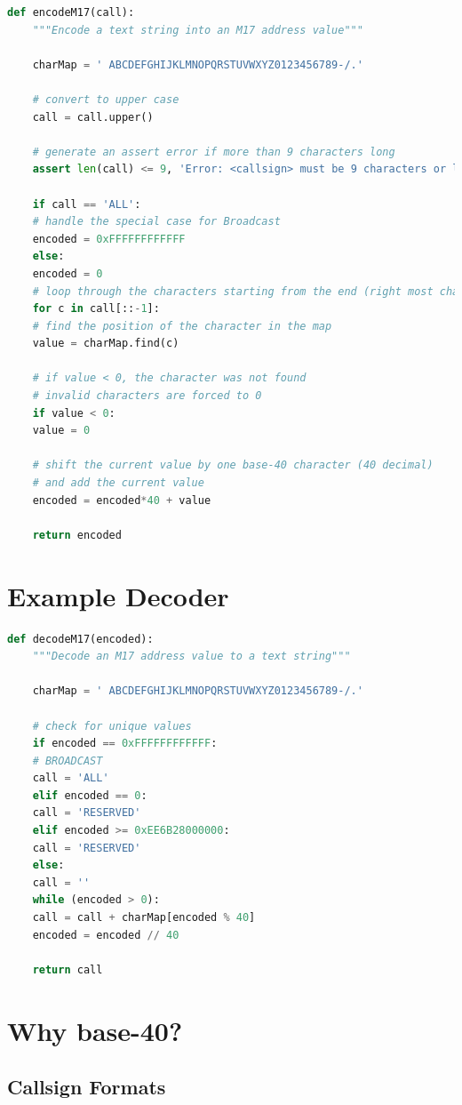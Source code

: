 \documentclass[a4paper,11pt]{book}
\begin{document}
\begin{lstlisting}[language=Python]
def encodeM17(call):
	"""Encode a text string into an M17 address value"""
	
	charMap = ' ABCDEFGHIJKLMNOPQRSTUVWXYZ0123456789-/.'
	
	# convert to upper case
	call = call.upper()
	
	# generate an assert error if more than 9 characters long
	assert len(call) <= 9, 'Error: <callsign> must be 9 characters or less'
	
	if call == 'ALL':
	# handle the special case for Broadcast
	encoded = 0xFFFFFFFFFFFF
	else:
	encoded = 0
	# loop through the characters starting from the end (right most character)
	for c in call[::-1]:
	# find the position of the character in the map
	value = charMap.find(c)
	
	# if value < 0, the character was not found
	# invalid characters are forced to 0
	if value < 0:
	value = 0
	
	# shift the current value by one base-40 character (40 decimal)
	# and add the current value
	encoded = encoded*40 + value
	
	return encoded
\end{lstlisting}

\section{Example Decoder}

\begin{lstlisting}[language=Python]
def decodeM17(encoded):
	"""Decode an M17 address value to a text string"""
	
	charMap = ' ABCDEFGHIJKLMNOPQRSTUVWXYZ0123456789-/.'
	
	# check for unique values
	if encoded == 0xFFFFFFFFFFFF:
	# BROADCAST
	call = 'ALL'
	elif encoded == 0:
	call = 'RESERVED'
	elif encoded >= 0xEE6B28000000:
	call = 'RESERVED'
	else:
	call = ''
	while (encoded > 0):
	call = call + charMap[encoded % 40]
	encoded = encoded // 40
	
	return call
\end{lstlisting}

\section{Why base-40?}

\subsection{Callsign Formats}
\end{document}
